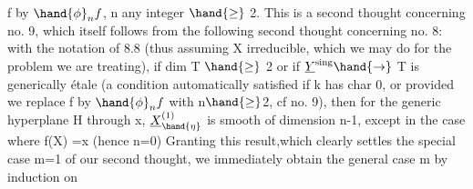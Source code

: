 f by $\hand{\phi}_{n}f$, n any integer $\hand{\geq}$ 2. This is a second thought concerning no. 9,
which itself follows from the following second thought concerning no. 8: with the notation of
8.8 (thus assuming X irreducible, which we may do for the problem
we are treating), if dim T $\hand{\geq}$ 2 or if $\underline{Y}^{\text{sing}}\hand{\rightarrow}$ T is
generically étale (a condition automatically satisfied if k has char 0,
or provided we replace f by $\hand{\phi}_{n}f$ with n$\hand{\geq}$2, cf no. 9), then for
the  generic hyperplane H\hand{$_{\eta}$} through x,  $\underline{X}^{(1)}_{\hand{\eta}}$ is smooth
of dimension n-1, except in the case where f(X) =\hand{$\{$}x\hand{$\}$} (hence n=0)
Granting this result,\hand{(}which clearly settles the special case m=1 of
our second thought, we immediately obtain the general case m by induction on

